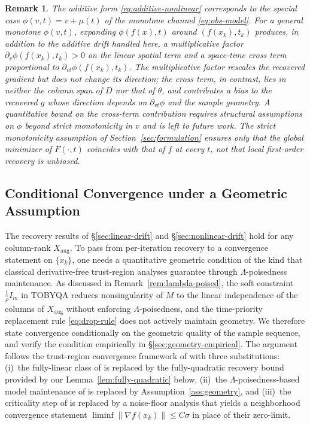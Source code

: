 \documentclass[11pt,a4paper]{article}
\newtheorem{remark}[theorem]{Remark}
\begin{document}
\begin{remark}\label{rem:monotone-channel}
The additive form \eqref{eq:additive-nonlinear} corresponds to the
special case $\phi(v, t) = v + \mu(t)$ of the monotone channel
\eqref{eq:obs-model}. For a general monotone $\phi(v, t)$,
expanding $\phi(f(x), t)$ around $(f(x_k), t_k)$ produces, in
addition to the additive drift handled here, a multiplicative
factor $\partial_v \phi(f(x_k), t_k) > 0$ on the linear spatial
term and a space-time cross term proportional to
$\partial_{vt}\phi(f(x_k), t_k)$. The multiplicative factor
rescales the recovered gradient but does not change its direction;
the cross term, in contrast, lies in neither the column span of
$D$ nor that of $\theta$, and contributes a bias to the recovered
$g$ whose direction depends on $\partial_{vt}\phi$ and the
sample geometry. A quantitative bound on the cross-term
contribution requires structural assumptions on $\phi$ beyond
strict monotonicity in $v$ and is left to future work. The strict
monotonicity assumption of Section~\ref{sec:formulation} ensures
only that the global minimizer of $F(\cdot, t)$ coincides with
that of $f$ at every $t$, not that local first-order recovery is
unbiased.
\end{remark}

\subsection{Conditional Convergence under a Geometric Assumption}
\label{sec:conditional-convergence}

The recovery results of \S\ref{sec:linear-drift} and
\S\ref{sec:nonlinear-drift} hold for any column-rank
$X_{\mathrm{aug}}$. To pass from per-iteration recovery to a
convergence statement on $\{x_k\}$, one needs a quantitative
geometric condition of the kind that classical derivative-free
trust-region analyses
\cite{ConnScheinbergVicente2009SIOPT} guarantee through
$\Lambda$-poisedness maintenance. As discussed in
Remark~\ref{rem:lambda-poised}, the soft constraint
$\tfrac{1}{\rho}I_m$ in TOBYQA reduces nonsingularity of $M$ to
the linear independence of the columns of $X_{\mathrm{aug}}$
without enforcing $\Lambda$-poisedness, and the time-priority
replacement rule \eqref{eq:drop-rule} does not actively
maintain geometry. We therefore state convergence
conditionally on the geometric quality of the sample sequence,
and verify the condition empirically in
\S\ref{sec:geometry-empirical}. The argument follows the
trust-region convergence framework of
\cite{ConnScheinbergVicente2009SIOPT} with three substitutions:
(i)~the fully-linear class of
\cite[Definition~3.1]{ConnScheinbergVicente2009SIOPT} is
replaced by the fully-quadratic recovery bound provided by our
Lemma~\ref{lem:fully-quadratic} below, (ii)~the
$\Lambda$-poisedness-based model maintenance of
\cite[\S4]{ConnScheinbergVicente2009SIOPT} is replaced by
Assumption~\ref{ass:geometry}, and (iii)~the criticality step
of \cite[Algorithm~4.1, Step~1]{ConnScheinbergVicente2009SIOPT}
is replaced by a noise-floor analysis that yields a
neighborhood convergence statement
$\liminf\|\nabla f(x_k)\|\le C\sigma$ in place of their
zero-limit.
\end{document}
